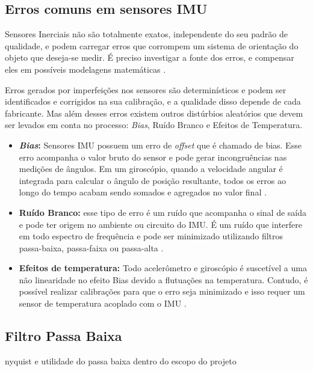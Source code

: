 \subsection{Erros comuns em sensores IMU}

Sensores Inerciais não são totalmente exatos, independente do seu padrão de qualidade, e podem carregar erros que corrompem um sistema de orientação do objeto que deseja-se medir. É preciso investigar a fonte dos erros, e compensar eles em possíveis modelagens matemáticas \cite{diss:FabioAUV}.

Erros gerados por imperfeições nos sensores são determinísticos e podem ser identificados e corrigidos na sua calibração, e a qualidade disso depende de cada fabricante. Mas além desses erros existem outros distúrbios aleatórios que devem ser levados em conta no processo: \textit{Bias}, Ruído Branco e Efeitos de Temperatura.

\begin{itemize}
	\item \textbf{\textit{Bias}:} Sensores IMU possuem um erro de \textit{offset} que é chamado de bias. Esse erro acompanha o valor bruto do sensor e pode gerar incongruências nas medições de ângulos. Em um giroscópio, quando a velocidade angular é integrada para calcular o ângulo de posição resultante, todos os erros ao longo do tempo acabam sendo somados e agregados no valor final \cite{manual:cambimu}. 
	
	\item \textbf{Ruído Branco:} esse tipo de erro é um ruído que acompanha o sinal de saída e pode ter origem no ambiente ou circuito do IMU. É um ruído que interfere em todo  espectro de frequência e pode ser minimizado utilizando filtros passa-baixa, passa-faixa ou passa-alta \cite{diss:FabioAUV}.
	
	\item \textbf{Efeitos de temperatura:} Todo acelerômetro e giroscópio é suscetível a uma não linearidade no efeito Bias devido a flutuações na temperatura. Contudo, é possível realizar calibrações para que o erro seja minimizado e isso requer um sensor de temperatura acoplado com o IMU \cite{manual:cambimu}. 
\end{itemize}

\subsection{Filtro Passa Baixa}

nyquist e utilidade do passa baixa dentro do escopo do projeto

